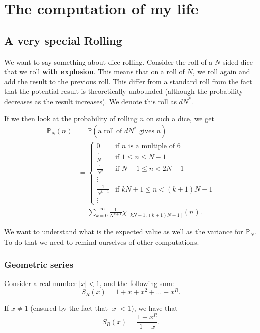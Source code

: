 \documentclass[a4paper,oneside,11pt]{book}
\renewcommand{\Pr}{\mathbb{P}}
\begin{document}
\chapter{The computation of my life}
\section{A very special Rolling}
We want to say something about dice rolling. Consider the roll of a $N$-sided dice that we roll {\bfseries with explosion}. This means that on a roll of $N$, we roll again and add the result to the previous roll. This differ from a standard roll from the fact that the potential result is theoretically unbounded (although the probability decreases as the result increases). We denote this roll as $dN^*$.

If we then look at the probability of rolling $n$ on such a dice, we get
\begin{align}
	\Pr_N(n)&=\Pr\left(\mbox{a roll of }dN^*\mbox{ gives }n\right)=
\\
	&=\left\{\begin{array}{cl}
		0						& \mbox{if } n \mbox{ is a multiple of }6	\\
		\frac1N 		& \mbox{if } 1\le n\le N-1	\\
		\frac1{N^2} & \mbox{if } N+1\le n<2N-1	\\
		\vdots			&	\\
		\frac1{N^{k+1}} & \mbox{if } kN+1\le n<\left(k+1\right)N-1	\\
		\vdots
	\end{array}\right.
\\
	&=\sum_{k=0}^{+\infty}\frac1{N^{k+1}}\chi_{[kN+1,\left(k+1\right)N-1]}(n).
\end{align}

We want to understand what is the expected value as well as the variance for $\Pr_N$. To do that we need to remind ourselves of other computations.

\subsection{Geometric series}
Consider a real number $\left|x\right|<1$, and the following sum:
\begin{equation}
	S_R(x)=1+x+x^2+\ldots+x^R.
\end{equation}

If $x\neq1$ (ensured by the fact that $\left|x\right|<1$), we have that
\begin{equation}
	S_R(x)=\frac{1-x^R}{1-x}.
\end{equation}
\end{document}
